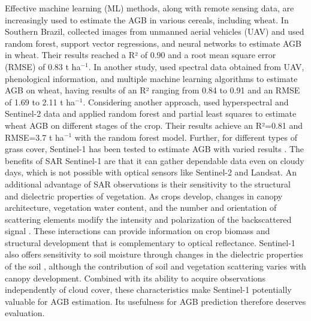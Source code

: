 \documentclass[
  british,
]{interact}
\begin{document}
Effective machine learning (ML) methods, along with remote sensing data,
are increasingly used to estimate the AGB in various cereals, including
wheat. In Southern Brazil, \citet{AtkinsonAmorim2022} collected images
from unmanned aerial vehicles (UAV) and used random forest, support
vector regressions, and neural networks to estimate AGB in wheat. Their
results reached a R² of 0.90 and a root mean square error (RMSE) of 0.83
t ha\(^{-1}\). In another study, \citet{Liu2024} used spectral data
obtained from UAV, phenological information, and multiple machine
learning algorithms to estimate AGB on wheat, having results of an R²
ranging from 0.84 to 0.91 and an RMSE of 1.69 to 2.11 t ha\(^{-1}\).
Considering another approach, \citet{Marshall2022} used hyperspectral
and Sentinel-2 data and applied random forest and partial least squares
to estimate wheat AGB on different stages of the crop. Their results
achieve an R²=0.81 and RMSE=3.7 t ha\(^{-1}\) with the random forest
model. Further, for different types of grass cover, Sentinel-1 has been
tested to estimate AGB with varied results
\citep{David2022, Li2024, Nuthammachot2022}. The benefits of SAR
Sentinel-1 are that it can gather dependable data even on cloudy days,
which is not possible with optical sensors like Sentinel-2 and Landsat.
An additional advantage of SAR observations is their sensitivity to the
structural and dielectric properties of vegetation. As crops develop,
changes in canopy architecture, vegetation water content, and the number
and orientation of scattering elements modify the intensity and
polarization of the backscattered signal \citep{steele2017radar}. These
interactions can provide information on crop biomass and structural
development that is complementary to optical reflectance. Sentinel-1
also offers sensitivity to soil moisture through changes in the
dielectric properties of the soil \citep{Fan2025, Zhu2024}, although the
contribution of soil and vegetation scattering varies with canopy
development. Combined with its ability to acquire observations
independently of cloud cover, these characteristics make Sentinel-1
potentially valuable for AGB estimation. Its usefulness for AGB
prediction therefore deserves evaluation.
\end{document}
